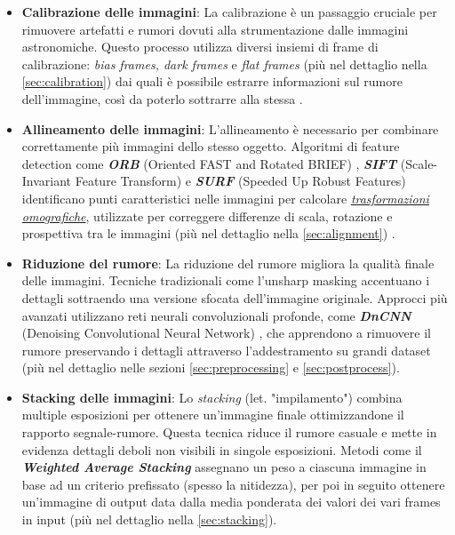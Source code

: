 \begin{itemize}
\item \textbf{Calibrazione delle immagini}: La calibrazione è un passaggio cruciale per rimuovere artefatti e rumori dovuti alla strumentazione dalle immagini astronomiche. Questo processo utilizza diversi insiemi di frame di calibrazione: \textit{bias frames, dark frames} e \textit{flat frames} (più nel dettaglio nella \cref{sec:calibration}) dai quali è possibile estrarre informazioni sul rumore dell'immagine, così da poterlo sottrarre alla stessa \cite{calibration_1} \cite{calibration_2}.

\item \textbf{Allineamento delle immagini}: L'allineamento è necessario per combinare correttamente più immagini dello stesso oggetto. Algoritmi di feature detection come \textit{\textbf{ORB}} (Oriented FAST and Rotated BRIEF) \cite{orb}, \textit{\textbf{SIFT}} (Scale-Invariant Feature Transform) e \textit{\textbf{SURF}} (Speeded Up Robust Features) identificano punti caratteristici nelle immagini per calcolare \hyperref[subsec:homography]{\textit{trasformazioni omografiche}}, utilizzate per correggere differenze di scala, rotazione e prospettiva tra le immagini (più nel dettaglio nella \cref{sec:alignment}) \cite{multiwavelength_image_proc} \cite{calibration_2}.

\item \textbf{Riduzione del rumore}: La riduzione del rumore migliora la qualità finale delle immagini. Tecniche tradizionali come l'unsharp masking \cite{multiwavelength_image_proc} accentuano i dettagli sottraendo una versione sfocata dell'immagine originale. Approcci più avanzati utilizzano reti neurali convoluzionali profonde, come \textit{\textbf{DnCNN}} (Denoising Convolutional Neural Network) \cite{DnCnn}, che apprendono a rimuovere il rumore preservando i dettagli attraverso l'addestramento su grandi dataset (più nel dettaglio nelle sezioni \ref{sec:preprocessing} e \ref{sec:postprocess}).

\item \textbf{Stacking delle immagini}: Lo \textit{stacking} (let. "impilamento") combina multiple esposizioni per ottenere un'immagine finale ottimizzandone il rapporto segnale-rumore. Questa tecnica riduce il rumore casuale e mette in evidenza dettagli deboli non visibili in singole esposizioni. Metodi come il \textbf{\textit{Weighted Average Stacking}} assegnano un peso a ciascuna immagine in base ad un criterio prefissato (spesso la nitidezza), per poi in seguito ottenere un'immagine di output data dalla media ponderata dei valori dei vari frames in input (più nel dettaglio nella \cref{sec:stacking}).
\end{itemize}

